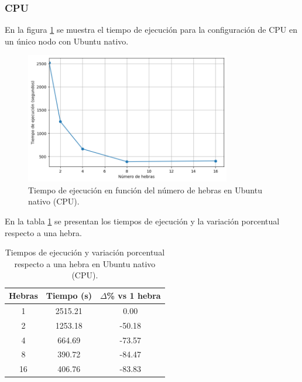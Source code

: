 \subsubsection{CPU}

En la figura \ref{fig:single-node_ubuntu_cpu_native_time} se muestra el tiempo de ejecución para la configuración de CPU en un único nodo con Ubuntu nativo.

\begin{figure}[H]
    \centering
    \includegraphics[width=0.8\textwidth]{imagenes/cap5/single-node_ubuntu_cpu_native_time.png}
    \caption{Tiempo de ejecución en función del número de hebras en Ubuntu nativo (CPU).}
    \label{fig:single-node_ubuntu_cpu_native_time}
\end{figure}

En la tabla \ref{tab:single-node_ubuntu_cpu_native} se presentan los tiempos de ejecución y la variación porcentual respecto a una hebra.

\begin{table}[ht]
    \centering
    \begin{tabular}{|c|c|c|}
        \hline
        \textbf{Hebras} & \textbf{Tiempo (s)} & \textbf{$\Delta$\% vs 1 hebra} \\
        \hline
        1               & 2515.21             & 0.00                           \\
        2               & 1253.18             & -50.18                         \\
        4               & 664.69              & -73.57                         \\
        8               & 390.72              & -84.47                         \\
        16              & 406.76              & -83.83                         \\
        \hline
    \end{tabular}
    \caption{Tiempos de ejecución y variación porcentual respecto a una hebra en Ubuntu nativo (CPU).}
    \label{tab:single-node_ubuntu_cpu_native}
\end{table}

